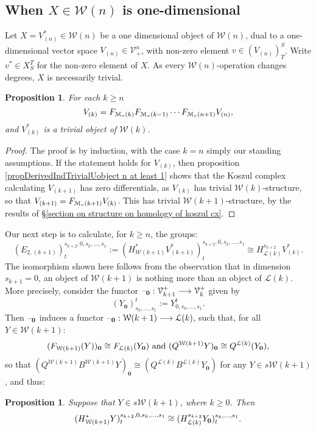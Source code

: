 \documentclass[11pt]{amsart}
\theoremstyle{plain}
\newtheorem{prop}[thm]{Proposition}
\theoremstyle{definition}
\newcommand{\DASH}{\textup{--}}
\renewcommand{\to}{\longrightarrow}
\newcommand{\calL}{\mathcal{L}}
\newcommand{\calV}{\mathcal{V}}
\newcommand{\calM}{\mathcal{M}}
\newcommand{\calw}{\mathcal{W}}
\newcommand{\calMv}{\mathcal{M}_\textup{v}}
\theoremstyle{plain}
\newcommand{\vect}[2]{\calV^{#1}_{#2}}
\begin{document}
\begin{Calculations of HWn for n nonzero}
\subsection{When $X\in\calw(n)$ is one-dimensional}
Let $X=V^*_{(n)}\in\calw(n)$ be a one dimensional object of $\calw(n)$, %
dual to a one-dimensional vector space $V_{(n)}\in\vect{n}{+}$, with non-zero element $v\in(V_{(n)})^S_T$. Write $v^*\in X^T_{S}$ for the non-zero element of $X$. As every $\calw(n)$-operation changes degrees, $X$ is necessarily trivial.
\begin{prop}\label{iterative calc of the Vk all trivial}
For each $k\geq n$
\[V_{(k)}=F_{\calMv(k)}F_{\calMv(k-1)}\cdots F_{\calMv(n+1)}V_{(n)},\]
and $V^*_{(k)}$ is a trivial object of $\calw(k)$.
\end{prop}
\begin{proof}
The proof is by induction, with the case $k=n$ simply our standing assumptions. If the statement holds for $V_{(k)}$, then proposition \ref{propDerivedIndTrivialUobject n at least 1} shows that the Koszul complex calculating $V_{(k+1)}$ has zero differentials, as $V_{(k)}$ has trivial $\calw(k)$-structure, so that $V_{(k+1)}=F_{\calM_{\textup{v}}(k+1)}V_{(k)}$. This has trivial $\calw(k+1)$-structure, by the results of \S\ref{section on structure on homology of koszul cx}.
\end{proof}
Our next step is to calculate, for $k\geq n$, the groups:
\[(E_{2,(k+1)})^{s_{k+2},0,s_k,\ldots,s_1}_{t}:=(H^*_{\calw(k+1)}V^*_{(k+1)})^{s_{k+2},0,s_k,\ldots,s_1}_{t}\cong H^{s_{k+2}}_{\calL(k)}V^*_{(k)}.\]
The isomorphism shown here follows from the observation that in dimension $s_{k+1}=0$, an object of $\calw(k+1)$ is nothing more than an object of $\calL(k)$. More precisely, consider the functor $\DASH_\textbf{0}:\vect{+}{k+1}\to \vect{+}{k}$ given by
\[(Y_\textbf{0})^t_{s_k,\ldots,s_1}:=Y^t_{0,s_k,\ldots,s_1}.\]
Then $\DASH_\textbf{0}$ induces a functor $\DASH_\textbf{0}:\calw(k+1)\to \calL(k)$, such that, for all $Y\in\calw(k+1)$:
\[(F_{\calw(k+1)}(Y))_\textbf{0}\cong F_{\calL(k)}(Y_\textbf{0})\textup{ and }(Q^{\calw(k+1)}Y)_\textbf{0}\cong Q^{\calL(k)}(Y_\textbf{0}),\]
so that $(Q^{\calw(k+1)}B^{\calw(k+1)}Y)_{\textbf{0}}\cong(Q^{\calL(k)}B^{\calL(k)}Y_{\textbf{0}})$ for any $Y\in s\calw(k+1)$, and thus:
\begin{prop}
Suppose that $Y\in s\calw(k+1)$, where $k\geq0$. Then
\[(H^*_{\calw(k+1)}Y)^{s_{k+2},0,s_k,\ldots,s_1}_{t}\cong (H^{s_{k+2}}_{\calL(k)}Y_\textup{\textbf{0}})^{s_k,\ldots,s_1}_t.\]

\end{prop}
\end{Calculations of HWn for n nonzero}
\end{document}
